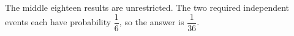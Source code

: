 The middle eighteen results are unrestricted. The two required independent events each have probability $\dfrac{1}{6}$, so the answer is $\boxed{\dfrac{1}{36}}$.
